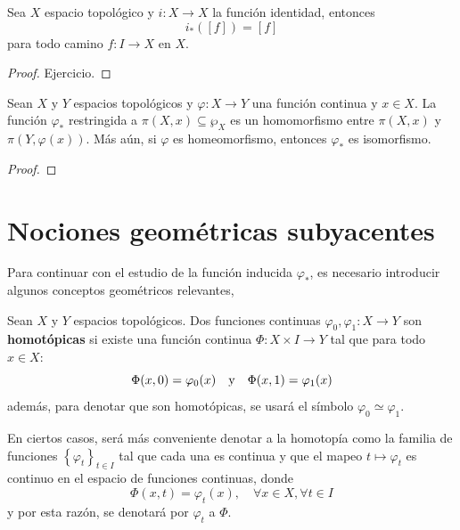 \documentclass[12pt]{report}
\theoremstyle{largebreak}
\newcommand\cf[3]{\ensuremath{#1:#2\rightarrow#3}}
\begin{document}
    \begin{excer}
        Sea $X$ espacio topológico y $\cf{i}{X}{X}$ la función identidad, entonces
        \begin{equation*}
            i_*([f])=[f]
        \end{equation*}
        para todo camino $\cf{f}{I}{X}$ en $X$.
    \end{excer}

    \begin{proof}
        Ejercicio.
    \end{proof}

    \begin{cor}
        Sean $X$ y $Y$ espacios topológicos y $\cf{\varphi}{X}{Y}$ una función continua y $x\in X$. La función $\varphi_*$ restringida a $\pi(X,x)\subseteq\wp_X$ es un homomorfismo entre $\pi(X,x)$ y $\pi(Y,\varphi(x))$. Más aún, si $\varphi$ es homeomorfismo, entonces $\varphi_*$ es isomorfismo.
    \end{cor}

    \begin{proof}
        
    \end{proof}

    \section{Nociones geométricas subyacentes}

    Para continuar con el estudio de la función inducida $\varphi_*$, es necesario introducir algunos conceptos geométricos relevantes,

    \begin{mydef}
        Sean $X$ y $Y$ espacios topológicos. Dos funciones continuas $\cf{\varphi_0,\varphi_1}{X}{Y}$ son \textbf{homotópicas} si existe una función continua $\cf{\Phi}{X\times I}{Y}$ tal que para todo $x\in X$:
        \begin{equation*}
            \Phi(x,0)=\varphi_0(x)\quad\textup{y}\quad\Phi(x,1)=\varphi_1(x)
        \end{equation*}
        además, para denotar que son homotópicas, se usará el símbolo $\varphi_0\simeq\varphi_1$.
    \end{mydef}

    \begin{obs}
        En ciertos casos, será más conveniente denotar a la homotopía como la familia de funciones $\left\{\varphi_t \right\}_{ t\in I}$ tal que cada una es continua y que el mapeo $t\mapsto \varphi_t$ es continuo en el espacio de funciones continuas, donde
        \begin{equation*}
            \Phi(x,t)=\varphi_t(x),\quad\forall x\in X,\forall t\in I
        \end{equation*}
        y por esta razón, se denotará por $\varphi_t$ a $\Phi$.
    \end{obs}
\end{document}
